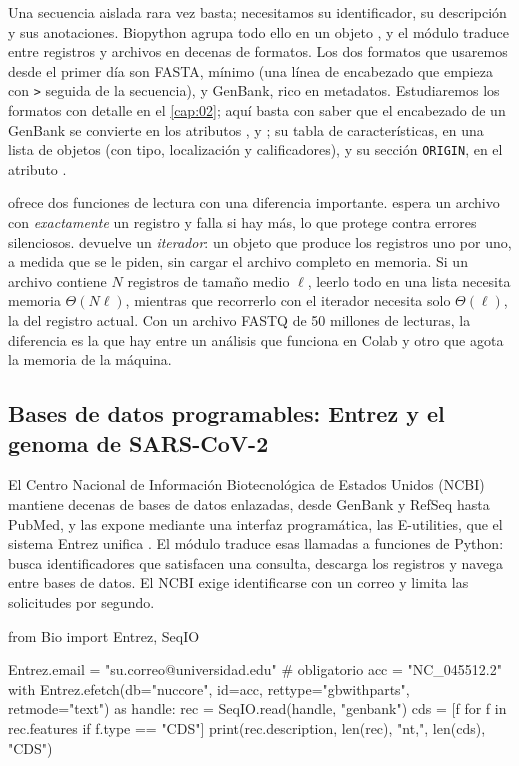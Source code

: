 Una secuencia aislada rara vez basta; necesitamos su identificador, su descripción y sus anotaciones. Biopython agrupa todo ello en un objeto , y el módulo  traduce entre registros y archivos en decenas de formatos. Los dos formatos que usaremos desde el primer día son FASTA, mínimo (una línea de encabezado que empieza con \texttt{>} seguida de la secuencia), y GenBank, rico en metadatos. Estudiaremos los formatos con detalle en el \cref{cap:02}; aquí basta con saber que el encabezado de un GenBank se convierte en los atributos ,  y ; su tabla de características, en una lista de objetos  (con tipo, localización y calificadores), y su sección \texttt{ORIGIN}, en el atributo .


 ofrece dos funciones de lectura con una diferencia importante.  espera un archivo con \emph{exactamente} un registro y falla si hay más, lo que protege contra errores silenciosos.  devuelve un \emph{iterador}: un objeto que produce los registros uno por uno, a medida que se le piden, sin cargar el archivo completo en memoria. Si un archivo contiene $N$ registros de tamaño medio $\ell$, leerlo todo en una lista necesita memoria $\Theta(N\ell)$, mientras que recorrerlo con el iterador necesita solo $\Theta(\ell)$, la del registro actual. Con un archivo FASTQ de 50 millones de lecturas, la diferencia es la que hay entre un análisis que funciona en Colab y otro que agota la memoria de la máquina.


\subsection{Bases de datos programables: Entrez y el genoma de SARS-CoV-2}

El Centro Nacional de Información Biotecnológica de Estados Unidos (NCBI) mantiene decenas de bases de datos enlazadas, desde GenBank y RefSeq hasta PubMed, y las expone mediante una interfaz programática, las E-utilities, que el sistema Entrez unifica \parencite{c00-sayers2022}. El módulo  traduce esas llamadas a funciones de Python:  busca identificadores que satisfacen una consulta,  descarga los registros y  navega entre bases de datos. El NCBI exige identificarse con un correo y limita las solicitudes por segundo.

\begin{codigo}
from Bio import Entrez, SeqIO

Entrez.email = "su.correo@universidad.edu"      # obligatorio
acc = "NC_045512.2"
with Entrez.efetch(db="nuccore", id=acc, rettype="gbwithparts",
                   retmode="text") as handle:
    rec = SeqIO.read(handle, "genbank")
cds = [f for f in rec.features if f.type == "CDS"]
print(rec.description, len(rec), "nt,", len(cds), "CDS")
\end{codigo}


